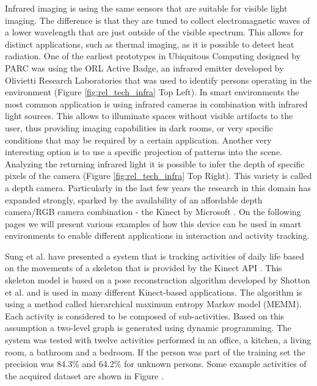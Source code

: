 Infrared imaging is using the same sensors that are suitable for visible light imaging. The difference is that they are tuned to collect electromagnetic waves of a lower wavelength that are just outside of the visible spectrum. This allows for distinct applications, such as thermal imaging, as it is possible to detect heat radiation. One of the earliest prototypes in Ubiquitous Computing designed by PARC was using the ORL Active Badge, an infrared emitter developed by Olivietti Research Laboratories that was used to identify persons operating in the environment \cite{Weiser1991} (Figure \ref{fig:rel_tech_infra} Top Left). In smart environments the most common application is using infrared cameras in combination with infrared light sources. This allows to illuminate spaces without visible artifacts to the user, thus providing imaging capabilities in dark rooms, or very specific conditions that may be required by a certain application. Another very interesting option is to use a specific projection of patterns into the scene. Analyzing the returning infrared light it is possible to infer the depth of specific pixels of the camera (Figure \ref{fig:rel_tech_infra} Top Right). This variety is called a depth camera. Particularly in the last few years the research in this domain has expanded strongly, sparked by the availability of an affordable depth camera/RGB camera combination - the Kinect by Microsoft \cite{zhang2012microsoft}. On the following pages we will present various examples of how this device can be used in smart environments to enable different applications in interaction and activity tracking.

Sung et al. have presented a system that is tracking activities of daily life based on the movements of a skeleton that is provided by the Kinect API \cite{sung2011human}. This skeleton model is based on a pose reconstruction algorithm developed by Shotton et al. \cite{Shotton2013} and is used in many different Kinect-based applications. The algorithm is using a method called hierarchical maximum entropy Markov model (MEMM). Each activity is considered to be composed of sub-activities. Based on this assumption a two-level graph is generated using dynamic programming. The system was tested with twelve activities performed in an office, a kitchen, a living room, a bathroom and a bedroom. If the person was part of the training set the precision was 84.3\% and 64.2\% for unknown persons. Some example activities of the acquired dataset are shown in Figure .

